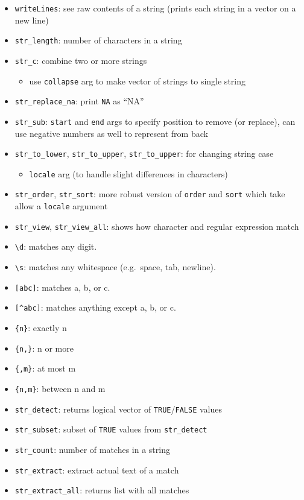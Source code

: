 \documentclass[]{book}
\providecommand{\tightlist}{%
  \setlength{\itemsep}{0pt}\setlength{\parskip}{0pt}}
\theoremstyle{definition}
\theoremstyle{definition}
\theoremstyle{definition}
\theoremstyle{remark}
\begin{document}
\begin{itemize}
\item
  \texttt{writeLines}: see raw contents of a string (prints each string
  in a vector on a new line)
\item
  \texttt{str\_length}: number of characters in a string
\item
  \texttt{str\_c}: combine two or more strings

  \begin{itemize}
  \tightlist
  \item
    use \texttt{collapse} arg to make vector of strings to single string
  \end{itemize}
\item
  \texttt{str\_replace\_na}: print \texttt{NA} as ``NA''
\item
  \texttt{str\_sub}: \texttt{start} and \texttt{end} args to specify
  position to remove (or replace), can use negative numbers as well to
  represent from back
\item
  \texttt{str\_to\_lower}, \texttt{str\_to\_upper},
  \texttt{str\_to\_upper}: for changing string case

  \begin{itemize}
  \tightlist
  \item
    \texttt{locale} arg (to handle slight differences in characters)
  \end{itemize}
\item
  \texttt{str\_order}, \texttt{str\_sort}: more robust version of
  \texttt{order} and \texttt{sort} which take allow a \texttt{locale}
  argument
\item
  \texttt{str\_view}, \texttt{str\_view\_all}: shows how character and
  regular expression match
\item
  \texttt{\textbackslash{}d}: matches any digit.
\item
  \texttt{\textbackslash{}s}: matches any whitespace (e.g.~space, tab,
  newline).
\item
  \texttt{{[}abc{]}}: matches a, b, or c.
\item
  \texttt{{[}\^{}abc{]}}: matches anything except a, b, or c.
\item
  \texttt{\{n\}}: exactly n
\item
  \texttt{\{n,\}}: n or more
\item
  \texttt{\{,m\}}: at most m
\item
  \texttt{\{n,m\}}: between n and m
\item
  \texttt{str\_detect}: returns logical vector of
  \texttt{TRUE}/\texttt{FALSE} values
\item
  \texttt{str\_subset}: subset of \texttt{TRUE} values from
  \texttt{str\_detect}
\item
  \texttt{str\_count}: number of matches in a string
\item
  \texttt{str\_extract}: extract actual text of a match
\item
  \texttt{str\_extract\_all}: returns list with all matches


\end{itemize}
\end{document}
